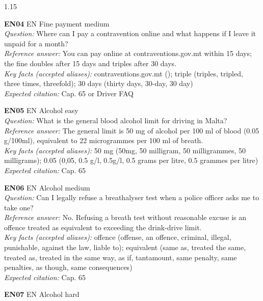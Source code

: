 \begin{spacing}{1.15}
\par\vspace{5pt}
\noindent\textbf{EN04} \quad EN \quad Fine payment \quad medium \\
\textit{Question:} Where can I pay a contravention online and what happens if I leave it unpaid for a month? \\
\textit{Reference answer:} You can pay online at contraventions.gov.mt within 15 days; the fine doubles after 15 days and triples after 30 days. \\
\textit{Key facts (accepted aliases):} contraventions.gov.mt (); triple (triples, tripled, three times, threefold); 30 days (thirty days, 30-day, 30 day) \\
\textit{Expected citation:} Cap. 65 or Driver FAQ
\par\vspace{5pt}
\noindent\textbf{EN05} \quad EN \quad Alcohol \quad easy \\
\textit{Question:} What is the general blood alcohol limit for driving in Malta? \\
\textit{Reference answer:} The general limit is 50 mg of alcohol per 100 ml of blood (0.05 g/100ml), equivalent to 22 microgrammes per 100 ml of breath. \\
\textit{Key facts (accepted aliases):} 50 mg (50mg, 50 milligram, 50 milligrammes, 50 milligrams); 0.05 (0,05, 0.5 g/l, 0.5g/l, 0.5 grams per litre, 0.5 grammes per litre) \\
\textit{Expected citation:} Cap. 65
\par\vspace{5pt}
\noindent\textbf{EN06} \quad EN \quad Alcohol \quad medium \\
\textit{Question:} Can I legally refuse a breathalyser test when a police officer asks me to take one? \\
\textit{Reference answer:} No. Refusing a breath test without reasonable excuse is an offence treated as equivalent to exceeding the drink-drive limit. \\
\textit{Key facts (accepted aliases):} offence (offense, an offence, criminal, illegal, punishable, against the law, liable to); equivalent (same as, treated the same, treated as, treated in the same way, as if, tantamount, same penalty, same penalties, as though, same consequences) \\
\textit{Expected citation:} Cap. 65
\par\vspace{5pt}
\noindent\textbf{EN07} \quad EN \quad Alcohol \quad hard \\

\end{spacing}
